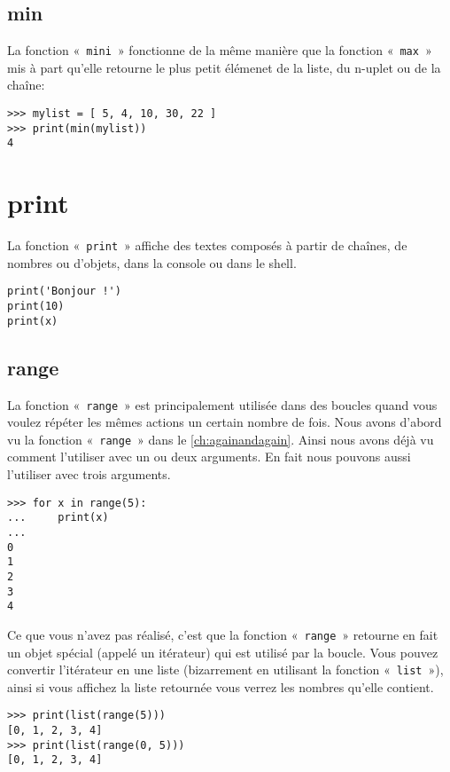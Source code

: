 \subsection*{min}
La fonction «~\texttt{mini}~» fonctionne de la même manière que la fonction «~\texttt{max}~» mis à part qu'elle retourne le plus petit élémenet de la liste, du n-uplet ou de la chaîne:
\begin{Verbatim}[frame=single,rulecolor=\color{gray}]
>>> mylist = [ 5, 4, 10, 30, 22 ]
>>> print(min(mylist))
4
\end{Verbatim}

\section*{print}
La fonction «~\texttt{print}~» affiche des textes composés à partir de chaînes, de nombres ou d'objets, dans la console ou dans le shell. 
\begin{Verbatim}[frame=single,rulecolor=\color{gray}]
print('Bonjour !')
print(10)
print(x)
\end{Verbatim}

\subsection*{range}

La fonction «~\texttt{range}~» est principalement utilisée dans des boucles quand vous voulez répéter les mêmes actions un certain nombre de fois.  Nous avons d'abord vu la fonction «~\texttt{range}~» dans le \autoref{ch:againandagain}. Ainsi nous avons déjà vu comment l'utiliser avec un ou deux arguments. En fait nous pouvons aussi l'utiliser avec trois arguments.

\begin{Verbatim}[frame=single,rulecolor=\color{gray}]
>>> for x in range(5):
...     print(x)
... 
0
1
2
3
4
\end{Verbatim}

Ce que vous n'avez pas réalisé, c'est que la fonction «~\texttt{range}~» retourne en fait un objet spécial (appelé un itérateur) qui est utilisé par la boucle. Vous pouvez convertir l'itérateur en une liste (bizarrement en utilisant la fonction «~\texttt{list}~»), ainsi si vous affichez la liste retournée vous verrez les nombres qu'elle contient.  

\begin{Verbatim}[frame=single,rulecolor=\color{gray}]
>>> print(list(range(5)))
[0, 1, 2, 3, 4]
>>> print(list(range(0, 5)))
[0, 1, 2, 3, 4]
\end{Verbatim}

